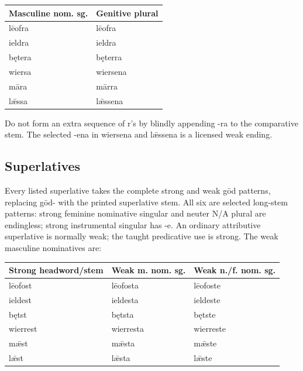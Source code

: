 \par\begingroup
\fontsize{10.5}{13.2}\selectfont
\setlength{\LTleft}{0pt}\setlength{\LTright}{\fill}
\noindent
\begin{tabular}{@{}>{\raggedright\arraybackslash}p{65.35mm}>{\raggedright\arraybackslash}p{55.84mm}@{}}
\toprule
\textbf{Masculine nom. sg.} & \textbf{Genitive plural} \\
\midrule
lēofra & lēofra \\
ieldra & ieldra \\
bętera & bęterra \\
wiersa & wiersena \\
māra & mārra \\
lǣssa & lǣssena \\
\bottomrule
\end{tabular}
\par\endgroup

Do not form an extra sequence of r’s by blindly appending -ra to the comparative stem. The selected -ena in wiersena and lǣssena is a licensed weak ending.

\subsection*{Superlatives}

Every listed superlative takes the complete strong and weak gōd patterns, replacing gōd- with the printed superlative stem. All six are selected long-stem patterns: strong feminine nominative singular and neuter N/\allowbreak{}A plural are endingless; strong instrumental singular has -e. An ordinary attributive superlative is normally weak; the taught predicative use is strong. The weak masculine nominatives are:

\par\begingroup
\fontsize{10.5}{13.2}\selectfont
\setlength{\LTleft}{0pt}\setlength{\LTright}{\fill}
\noindent
\begin{tabular}{@{}>{\raggedright\arraybackslash}p{45.74mm}>{\raggedright\arraybackslash}p{34.41mm}>{\raggedright\arraybackslash}p{38.23mm}@{}}
\toprule
\textbf{Strong headword/\allowbreak{}stem} & \textbf{Weak m. nom. sg.} & \textbf{Weak n./\allowbreak{}f. nom. sg.} \\
\midrule
lēofost & lēofosta & lēofoste \\
ieldest & ieldesta & ieldeste \\
bętst & bętsta & bętste \\
wierrest & wierresta & wierreste \\
mǣst & mǣsta & mǣste \\
lǣst & lǣsta & lǣste \\
\bottomrule
\end{tabular}
\par\endgroup

